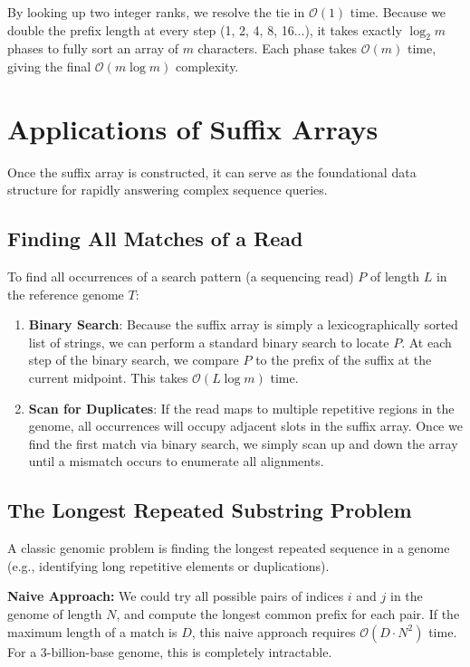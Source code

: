 \sta By looking up two integer ranks, we resolve the tie in $\mathcal{O}(1)$ time. Because we double the prefix length at every step (1, 2, 4, 8, 16...), it takes exactly $\log_2 m$ phases to fully sort an array of $m$ characters. Each phase takes $\mathcal{O}(m)$ time, giving the final $\mathcal{O}(m \log m)$ complexity.

\section{Applications of Suffix Arrays}

Once the suffix array is constructed, it can serve as the foundational data structure for rapidly answering complex sequence queries.

\subsection{Finding All Matches of a Read}

To find all occurrences of a search pattern (a sequencing read) $P$ of length $L$ in the reference genome $T$:
\begin{enumerate}
    \item \textbf{Binary Search}: Because the suffix array is simply a lexicographically sorted list of strings, we can perform a standard binary search to locate $P$. At each step of the binary search, we compare $P$ to the prefix of the suffix at the current midpoint. This takes $\mathcal{O}(L \log m)$ time.
    \item \textbf{Scan for Duplicates}: If the read maps to multiple repetitive regions in the genome, all occurrences will occupy adjacent slots in the suffix array. Once we find the first match via binary search, we simply scan up and down the array until a mismatch occurs to enumerate all alignments.
\end{enumerate}

\subsection{The Longest Repeated Substring Problem}

A classic genomic problem is finding the longest repeated sequence in a genome (e.g., identifying long repetitive elements or duplications).

\textbf{Naive Approach:}
We could try all possible pairs of indices $i$ and $j$ in the genome of length $N$, and compute the longest common prefix for each pair. 
If the maximum length of a match is $D$, this naive approach requires $\mathcal{O}(D \cdot N^2)$ time. For a 3-billion-base genome, this is completely intractable.

